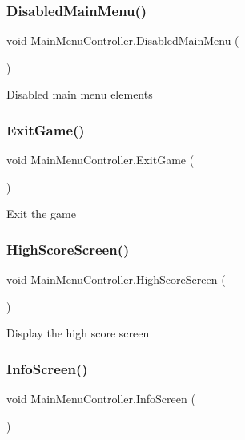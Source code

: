 \subsubsection{\texorpdfstring{Disabled\+Main\+Menu()}{DisabledMainMenu()}}
{\footnotesize\ttfamily void Main\+Menu\+Controller.\+Disabled\+Main\+Menu (\begin{DoxyParamCaption}{ }\end{DoxyParamCaption})\hspace{0.3cm}{\ttfamily [private]}}

Disabled main menu elements \mbox{\label{class_main_menu_controller_ac932610988eda8e09c4f8051bc27dad8}} 
\subsubsection{\texorpdfstring{Exit\+Game()}{ExitGame()}}
{\footnotesize\ttfamily void Main\+Menu\+Controller.\+Exit\+Game (\begin{DoxyParamCaption}{ }\end{DoxyParamCaption})}

Exit the game \mbox{\label{class_main_menu_controller_acd870723fa78c2cd858372a0638695f7}} 
\subsubsection{\texorpdfstring{High\+Score\+Screen()}{HighScoreScreen()}}
{\footnotesize\ttfamily void Main\+Menu\+Controller.\+High\+Score\+Screen (\begin{DoxyParamCaption}{ }\end{DoxyParamCaption})}

Display the high score screen \mbox{\label{class_main_menu_controller_a9727e79dd79b39d3e69401334e890108}} 
\subsubsection{\texorpdfstring{Info\+Screen()}{InfoScreen()}}
{\footnotesize\ttfamily void Main\+Menu\+Controller.\+Info\+Screen (\begin{DoxyParamCaption}{ }\end{DoxyParamCaption})}

